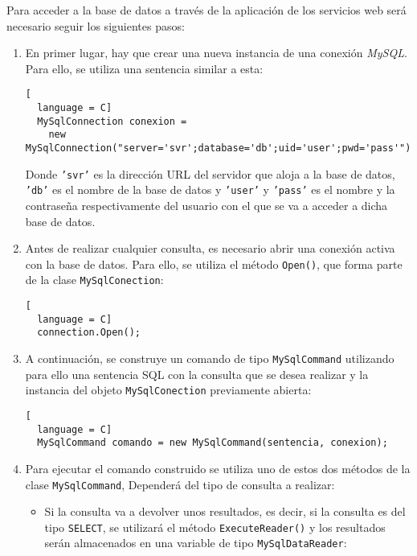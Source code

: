 Para acceder a la base de datos a través de la aplicación de los servicios web
será necesario seguir los siguientes pasos:
\begin{enumerate}
\item En primer lugar, hay que crear una nueva instancia de una conexión
\emph{MySQL}. Para ello, se utiliza una sentencia similar a esta:

\begin{lstlisting}[
  language = C]
  MySqlConnection conexion =
    new MySqlConnection("server='svr';database='db';uid='user';pwd='pass'");
\end{lstlisting}

Donde \texttt{'svr'} es la dirección \acs{URL} del servidor que aloja a la base
de datos, \texttt{'db'} es el nombre de la base de datos y \texttt{'user'} y
\texttt{'pass'} es el nombre y la contraseña respectivamente del usuario
con el que se va a acceder a dicha base de datos.

\item Antes de realizar cualquier consulta, es necesario
abrir una conexión activa con la base de datos. Para ello, se utiliza el
método \texttt{Open()}, que forma parte de la clase \texttt{MySqlConection}:

\begin{lstlisting}[
  language = C]
  connection.Open();
\end{lstlisting}

\item A continuación, se construye un comando de tipo \texttt{MySqlCommand}
utilizando para ello una sentencia \acs{SQL} con la consulta que se desea
realizar y la instancia del objeto \texttt{MySqlConection} previamente
abierta:

\begin{lstlisting}[
  language = C]
  MySqlCommand comando = new MySqlCommand(sentencia, conexion);
\end{lstlisting}

\item Para ejecutar el comando construido se utiliza uno de estos dos métodos
de la clase \texttt{MySqlCommand}, Dependerá del tipo de consulta a realizar:
\begin{itemize}
\item Si la consulta va a devolver unos resultados, es decir, si la consulta
es del tipo \texttt{SELECT}, se utilizará el método \texttt{ExecuteReader()}
y los resultados serán almacenados en una variable de tipo
\texttt{MySqlDataReader}:


\end{itemize}
\end{enumerate}
